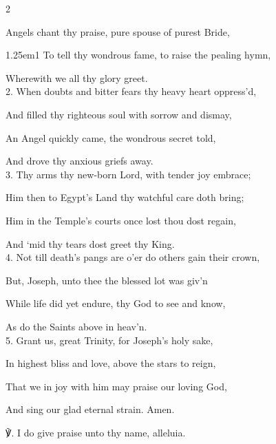 \begin{paracol}{2}
\sloppy
\firstEvensong\label{PatronageEvensong}


\firstEvensongHymn

 Angels chant thy praise, pure spouse of purest Bride,


\begin{hangparas}{1.25em}{1}
To tell thy wondrous fame, to raise the pealing hymn,

Wherewith we all thy glory greet.\\

2. When doubts and bitter fears thy heavy heart oppress'd,

And filled thy righteous soul with sorrow and dismay,

An Angel quickly came, the wondrous secret told,

And drove thy anxious griefs away.\\

3. Thy arms thy new-born Lord, with tender joy embrace;

Him then to Egypt’s Land thy watchful care doth bring;

Him in the Temple’s courts once lost thou dost regain,

And ‘mid thy tears dost greet thy King.\\

4. Not till death’s pangs are o’er do others gain their crown,

But, Joseph, unto thee the blessed lot was giv'n

While life did yet endure, thy God to see and know,

As do the Saints above in heav'n.\\

5. Grant us, great Trinity, for Joseph’s holy sake,

In highest bliss and love, above the stars to reign,

That we in joy with him may praise our loving God,

And sing our glad eternal strain. Amen.\\
\end{hangparas}

℣. I do give praise unto thy name, alleluia.


\end{paracol}
